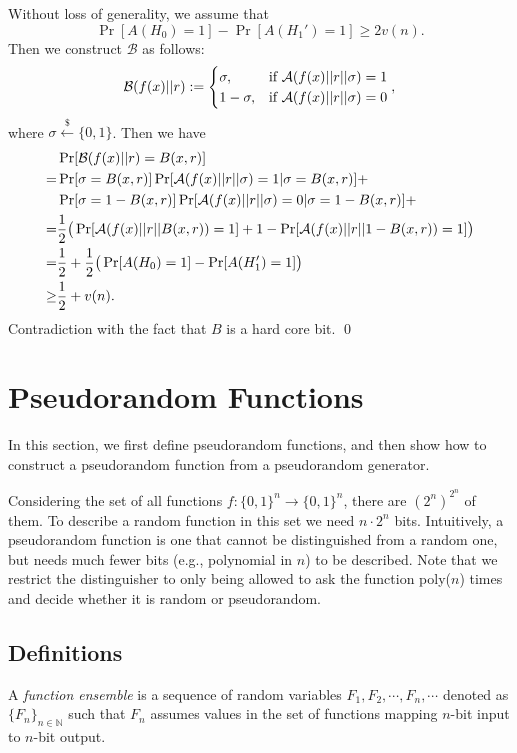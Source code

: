 Without loss of generality, we assume that
\[
\Pr[A(H_0) = 1] - \Pr[A(H_1') = 1]
\geq 2v(n).
\]
Then we construct $\mathcal{B}$ as follows:
\[
\mathcal{B}(f(x)|| r) :=
\begin{cases}
\sigma, & \text{if } {\mathcal A}(f(x)|| r||\sigma) = 1\\
1 - \sigma, & \text{if } {\mathcal A}(f(x)||r|| \sigma) = 0
\end{cases},
\]
where $\sigma \xleftarrow{\$} \{0, 1\}$.
Then we have
\begin{align*}
& \Pr[\mathcal{B}(f(x)|| r) = B(x, r)]\\
=& \Pr[\sigma = B(x, r)] \Pr[ {\mathcal A}(f(x)|| r||\sigma)=1 | \sigma = B(x, r)] + \\
& \Pr[\sigma = 1 - B(x, r)] \Pr[ {\mathcal A}(f(x)|| r||\sigma) = 0 | \sigma = 1- B(x, r)] + \\
=& \frac{1}{2} \big( \Pr[{\mathcal A}(f(x)||r||B(x, r)) = 1] + 1 - \Pr[{\mathcal A}(f(x)|| r|| 1- B(x, r)) = 1] \big)\\
=& \frac{1}{2} + \frac{1}{2} \big( \Pr[A(H_0) = 1] - \Pr[A(H_1') = 1] \big)\\
\geq & \frac{1}{2} + v(n).
\end{align*}
Contradiction with the fact that $B$ is a hard core bit.
\qed

\section{Pseudorandom Functions}
In this section, we first define pseudorandom functions, and then show how to  construct a pseudorandom function from a pseudorandom generator.

Considering the set of all functions $f: \{0, 1\}^n \rightarrow \{0, 1\}^n$, there are $(2^n)^{2^n}$ of them.
To describe a random function in this set we need $n \cdot 2^n$ bits.
Intuitively, a pseudorandom function is one that cannot be distinguished from a random one,
but needs much fewer bits (e.g., polynomial in $n$) to be described.
Note that we restrict the distinguisher to only being allowed to ask the function poly($n$) times and decide whether it is random or pseudorandom.

\subsection{Definitions}

\begin{definition}
A \emph{function ensemble} is a sequence of random variables $F_1, F_2, \cdots, F_n, \cdots$ denoted as $\{F_n\}_{n \in \mathbb{N}}$ such that
$F_n$ assumes values in the set of functions mapping $n$-bit input to $n$-bit output.
\end{definition}


